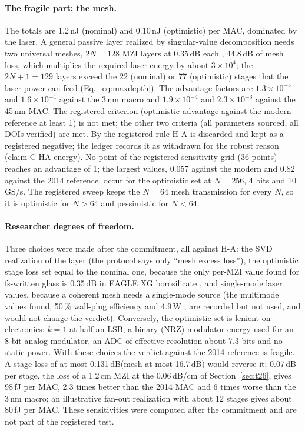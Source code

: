 \documentclass[11pt,a4paper]{article}
\newcommand{\dBcm}{\,dB/cm\xspace}
\newcommand{\dB}{\,dB\xspace}
\newcommand{\fJ}{\,fJ\xspace}
\begin{document}
\paragraph{The fragile part: the mesh.} The totals are 1.2\,nJ (nominal) and 0.10\,nJ (optimistic) per MAC, dominated by the laser. A general passive layer realized by singular-value decomposition needs two universal meshes, $2N=128$ MZI layers at 0.35\dB each \cite{Ceccarelli2020}, 44.8\dB of mesh loss, which multiplies the required laser energy by about $3\times10^4$; the $2N+1=129$ layers exceed the 22 (nominal) or 77 (optimistic) stages that the laser power can feed (Eq.~\eqref{eq:maxdepth}). The advantage factors are $1.3\times10^{-5}$ and $1.6\times10^{-4}$ against the 3\,nm macro and $1.9\times10^{-4}$ and $2.3\times10^{-3}$ against the 45\,nm MAC. The registered criterion (optimistic advantage against the modern reference at least 1) is not met; the other two criteria (all parameters sourced, all DOIs verified) are met. By the registered rule H-A is discarded and kept as a registered negative; the ledger records it as withdrawn for the robust reason (claim C-HA-energy). No point of the registered sensitivity grid (36 points) reaches an advantage of 1; the largest values, 0.057 against the modern and 0.82 against the 2014 reference, occur for the optimistic set at $N=256$, 4 bits and 10\,GS/s. The registered sweep keeps the $N=64$ mesh transmission for every $N$, so it is optimistic for $N>64$ and pessimistic for $N<64$.

\paragraph{Researcher degrees of freedom.} Three choices were made after the commitment, all against H-A: the SVD realization of the layer (the protocol says only ``mesh excess loss''), the optimistic stage loss set equal to the nominal one, because the only per-MZI value found for fs-written glass is 0.35\dB in EAGLE XG borosilicate \cite{Ceccarelli2020}, and single-mode laser values, because a coherent mesh needs a single-mode source (the multimode values found, 50\,\% wall-plug efficiency and 4.9\,W \cite{Garrod2014,Kanold2024}, are recorded but not used, and would not change the verdict). Conversely, the optimistic set is lenient on electronics: $k=1$ at half an LSB, a binary (NRZ) modulator energy used for an 8-bit analog modulator, an ADC of effective resolution about 7.3 bits and no static power. With these choices the verdict against the 2014 reference is fragile. A stage loss of at most 0.131\dB (mesh at most 16.7\dB) would reverse it; 0.07\dB per stage, the loss of a 1.2\,cm MZI at the 0.06\dBcm of Section~\ref{sec:t26}, gives 98\fJ per MAC, 2.3 times better than the 2014 MAC and 6 times worse than the 3\,nm macro; an illustrative fan-out realization with about 12 stages gives about 80\fJ per MAC. These sensitivities were computed after the commitment and are not part of the registered test.
\end{document}
